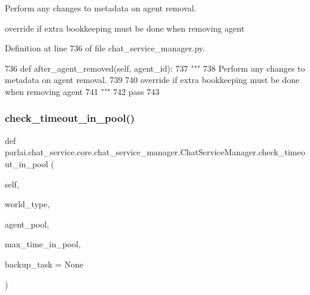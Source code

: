 \begin{DoxyVerb}Perform any changes to metadata on agent removal.

override if extra bookkeeping must be done when removing agent
\end{DoxyVerb}
 

Definition at line 736 of file chat\+\_\+service\+\_\+manager.\+py.


\begin{DoxyCode}
736     \textcolor{keyword}{def }after\_agent\_removed(self, agent\_id):
737         \textcolor{stringliteral}{"""}
738 \textcolor{stringliteral}{        Perform any changes to metadata on agent removal.}
739 \textcolor{stringliteral}{}
740 \textcolor{stringliteral}{        override if extra bookkeeping must be done when removing agent}
741 \textcolor{stringliteral}{        """}
742         \textcolor{keywordflow}{pass}
743 
\end{DoxyCode}
\mbox{\label{classparlai_1_1chat__service_1_1core_1_1chat__service__manager_1_1ChatServiceManager_a92c91891bbc88de69040bc979e9da468}} 
\subsubsection{\texorpdfstring{check\+\_\+timeout\+\_\+in\+\_\+pool()}{check\_timeout\_in\_pool()}}
{\footnotesize\ttfamily def parlai.\+chat\+\_\+service.\+core.\+chat\+\_\+service\+\_\+manager.\+Chat\+Service\+Manager.\+check\+\_\+timeout\+\_\+in\+\_\+pool (\begin{DoxyParamCaption}\item[{}]{self,  }\item[{}]{world\+\_\+type,  }\item[{}]{agent\+\_\+pool,  }\item[{}]{max\+\_\+time\+\_\+in\+\_\+pool,  }\item[{}]{backup\+\_\+task = {\ttfamily None} }\end{DoxyParamCaption})}

